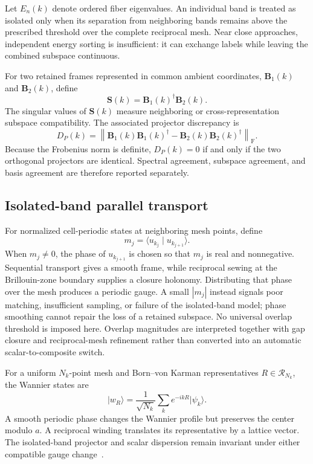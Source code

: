 Let $E_n(k)$ denote ordered fiber eigenvalues. An individual band is treated as
isolated only when its separation from neighboring bands remains above the
prescribed threshold over the complete reciprocal mesh. Near close approaches,
independent energy sorting is insufficient: it can exchange labels while
leaving the combined subspace continuous.

For two retained frames represented in common ambient coordinates,
$\mathbf B_1(k)$ and $\mathbf B_2(k)$, define
\begin{equation}
    \mathbf S(k)=\mathbf B_1(k)^\dagger\mathbf B_2(k).
\end{equation}
The singular values of $\mathbf S(k)$ measure neighboring or cross-representation
subspace compatibility. The associated projector discrepancy is
\begin{equation}
    D_P(k)
    =
    \left\lVert
        \mathbf B_1(k)\mathbf B_1(k)^\dagger
        -\mathbf B_2(k)\mathbf B_2(k)^\dagger
    \right\rVert_{\mathrm F}.
\end{equation}
Because the Frobenius norm is definite, $D_P(k)=0$ if and only if the two
orthogonal projectors are identical. Spectral agreement, subspace agreement,
and basis agreement are therefore reported separately.

\subsection{Isolated-band parallel transport}

For normalized cell-periodic states at neighboring mesh points, define
\begin{equation}
    m_j=\langle u_{k_j}\mid u_{k_{j+1}}\rangle.
\end{equation}
When $m_j\neq0$, the phase of $u_{k_{j+1}}$ is chosen so that $m_j$ is real and
nonnegative. Sequential transport gives a smooth frame, while reciprocal sewing
at the Brillouin-zone boundary supplies a closure holonomy. Distributing that
phase over the mesh produces a periodic gauge. A small $|m_j|$ instead signals poor matching, insufficient sampling, or
failure of the isolated-band model; phase smoothing cannot repair the loss of
a retained subspace. No universal overlap threshold is imposed here. Overlap
magnitudes are interpreted together with gap closure and reciprocal-mesh
refinement rather than converted into an automatic scalar-to-composite switch.

For a uniform $N_k$-point mesh and Born--von Karman representatives
$R\in\mathcal R_{N_k}$, the Wannier states are
\begin{equation}
    \lvert w_R\rangle
    =
    \frac{1}{\sqrt{N_k}}
    \sum_k e^{-ikR}\lvert\psi_k\rangle.
    \label{eq:periodic-1d-wannier-transform}
\end{equation}
A smooth periodic phase changes the Wannier profile but preserves the center
modulo $a$. A reciprocal winding translates its representative by a lattice
vector. The isolated-band projector and scalar dispersion remain invariant
under either compatible gauge change~\cite{kohn1959,marzari2012}.

